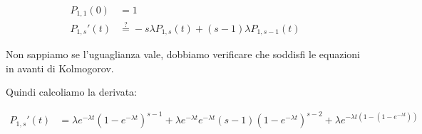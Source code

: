 \documentclass[a4paper,12pt]{book}
\begin{document}
\begin{align*}
	P_{1,1}(0) & = 1 \\
	P_{1,s}'(t) & \overset{?}{=} -s \lambda P_{1,s}(t) + (s-1)\lambda P_{1,s-1}(t)
\end{align*}

Non sappiamo se l'uguaglianza vale, dobbiamo verificare che soddisfi le equazioni in avanti di Kolmogorov. 


Quindi calcoliamo la derivata:

\begin{align*}
	P_{1,s}'(t) & = \lambda e^{-\lambda t }(1 - e^{-\lambda t})^{s-1} + \lambda e^{-\lambda t} e^{-\lambda t}(s-1)(1-e^{-\lambda t})^{s-2}  + \lambda e^{-\lambda t(1 - (1- e^{-\lambda t}))} %
\end{align*}

\backmatter
\end{document}
